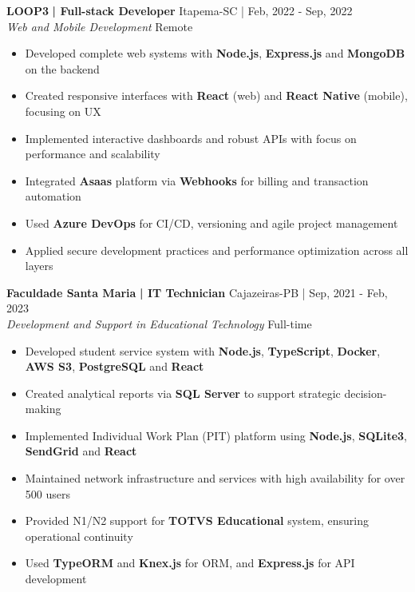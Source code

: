 \documentclass[a4paper]{article}
\begin{document}
\textbf{LOOP3}\textbf{ | Full-stack Developer} \hfill Itapema-SC | Feb, 2022 - Sep, 2022\\
\textit{Web and Mobile Development} \hfill Remote\\
\vspace{-3mm}
\begin{itemize} \itemsep -3pt
    \item Developed complete web systems with \textbf{Node.js}, \textbf{Express.js} and \textbf{MongoDB} on the backend
    \item Created responsive interfaces with \textbf{React} (web) and \textbf{React Native} (mobile), focusing on UX
    \item Implemented interactive dashboards and robust APIs with focus on performance and scalability
    \item Integrated \textbf{Asaas} platform via \textbf{Webhooks} for billing and transaction automation
    \item Used \textbf{Azure DevOps} for CI/CD, versioning and agile project management
    \item Applied secure development practices and performance optimization across all layers
\end{itemize}

\textbf{Faculdade Santa Maria}\textbf{ | IT Technician} \hfill Cajazeiras-PB | Sep, 2021 - Feb, 2023\\
\textit{Development and Support in Educational Technology} \hfill Full-time\\
\vspace{-3mm}
\begin{itemize} \itemsep -3pt
    \item Developed student service system with \textbf{Node.js}, \textbf{TypeScript}, \textbf{Docker}, \textbf{AWS S3}, \textbf{PostgreSQL} and \textbf{React}
    \item Created analytical reports via \textbf{SQL Server} to support strategic decision-making
    \item Implemented Individual Work Plan (PIT) platform using \textbf{Node.js}, \textbf{SQLite3}, \textbf{SendGrid} and \textbf{React}
    \item Maintained network infrastructure and services with high availability for over 500 users
    \item Provided N1/N2 support for \textbf{TOTVS Educational} system, ensuring operational continuity
    \item Used \textbf{TypeORM} and \textbf{Knex.js} for ORM, and \textbf{Express.js} for API development
\end{itemize}
\end{document}
